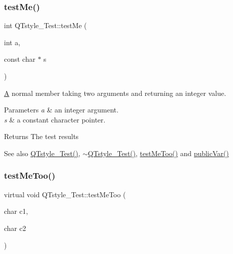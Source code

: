 \subsubsection{\texorpdfstring{testMe()}{testMe()}}
{\footnotesize\ttfamily int Q\+Tstyle\+\_\+\+Test\+::test\+Me (\begin{DoxyParamCaption}\item[{int}]{a,  }\item[{const char $\ast$}]{s }\end{DoxyParamCaption})}



\mbox{\hyperlink{class_a}{A}} normal member taking two arguments and returning an integer value. 


\begin{DoxyParams}{Parameters}
{\em a} & an integer argument. \\
\hline
{\em s} & a constant character pointer. \\
\hline
\end{DoxyParams}
\begin{DoxyReturn}{Returns}
The test results 
\end{DoxyReturn}
\begin{DoxySeeAlso}{See also}
\mbox{\hyperlink{class_q_tstyle___test_a14a296ea4e2ad446712f2310bec60766}{Q\+Tstyle\+\_\+\+Test()}}, \mbox{\hyperlink{class_q_tstyle___test_a7e82397d534d9a867f0857da01a46e9e}{$\sim$\+Q\+Tstyle\+\_\+\+Test()}}, \mbox{\hyperlink{class_q_tstyle___test_ad5b201f097a720d44bf976c2f27efbda}{test\+Me\+Too()}} and \mbox{\hyperlink{class_q_tstyle___test_aabf7b2e9ed83ea44aca4d213baae06d3}{public\+Var()}} 
\end{DoxySeeAlso}
\mbox{\label{class_q_tstyle___test_ad5b201f097a720d44bf976c2f27efbda}} 
\subsubsection{\texorpdfstring{testMeToo()}{testMeToo()}}
{\footnotesize\ttfamily virtual void Q\+Tstyle\+\_\+\+Test\+::test\+Me\+Too (\begin{DoxyParamCaption}\item[{char}]{c1,  }\item[{char}]{c2 }\end{DoxyParamCaption})\hspace{0.3cm}{\ttfamily [pure virtual]}}



